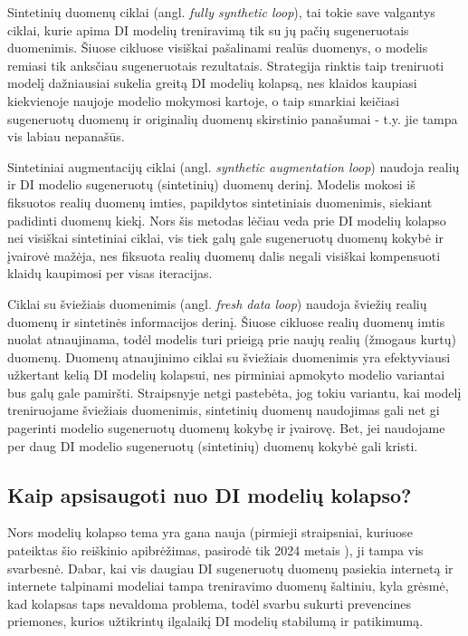 \documentclass{VUMIFInfKursinis}
\begin{document}

Sintetinių duomenų ciklai (angl. \textsl{fully synthetic loop}), tai tokie save valgantys ciklai, kurie apima DI modelių treniravimą tik su jų pačių sugeneruotais duomenimis. Šiuose cikluose visiškai pašalinami realūs duomenys, o modelis remiasi tik anksčiau sugeneruotais rezultatais. Strategija rinktis taip treniruoti modelį  dažniausiai sukelia greitą DI modelių kolapsą, nes klaidos kaupiasi kiekvienoje naujoje modelio mokymosi kartoje, o taip smarkiai keičiasi sugeneruotų duomenų ir originalių duomenų skirstinio panašumai - t.y. jie tampa vis labiau nepanašūs.



Sintetiniai augmentacijų ciklai (angl. \textsl{synthetic augmentation loop}) naudoja realių ir DI modelio sugeneruotų (sintetinių) duomenų derinį. Modelis mokosi iš fiksuotos realių duomenų imties, papildytos sintetiniais duomenimis, siekiant padidinti duomenų kiekį. Nors šis metodas lėčiau veda prie DI modelių kolapso nei visiškai sintetiniai ciklai, vis tiek galų gale sugeneruotų duomenų kokybė ir įvairovė mažėja, nes fiksuota realių duomenų dalis negali visiškai kompensuoti klaidų kaupimosi per visas iteracijas.


Ciklai su šviežiais duomenimis (angl. \textsl{fresh data loop}) naudoja šviežių realių duomenų ir sintetinės informacijos derinį. Šiuose cikluose realių duomenų imtis nuolat atnaujinama, todėl modelis turi prieigą prie naujų realių (žmogaus kurtų) duomenų. Duomenų atnaujinimo ciklai su šviežiais duomenimis yra efektyviausi užkertant kelią DI modelių kolapsui, nes  pirminiai apmokyto modelio variantai bus galų gale pamiršti. Straipsnyje netgi pastebėta, jog tokiu variantu, kai modelį treniruojame šviežiais duomenimis, sintetinių duomenų naudojimas gali net gi pagerinti modelio sugeneruotų duomenų kokybę ir įvairovę. Bet, jei naudojame per daug DI modelio sugeneruotų (sintetinių) duomenų kokybė gali kristi. 



\subsection{Kaip apsisaugoti nuo DI modelių kolapso?}

Nors modelių kolapso tema yra gana nauja (pirmieji straipsniai, kuriuose pateiktas šio reiškinio apibrėžimas, pasirodė tik 2024 metais \cite{CurseOfRecursion}), ji tampa vis svarbesnė. Dabar, kai vis daugiau DI sugeneruotų duomenų pasiekia internetą ir internete talpinami modeliai tampa treniravimo duomenų šaltiniu, kyla grėsmė, kad kolapsas taps nevaldoma problema, todėl svarbu sukurti prevencines priemones, kurios užtikrintų ilgalaikį DI modelių stabilumą ir patikimumą.
\end{document}
